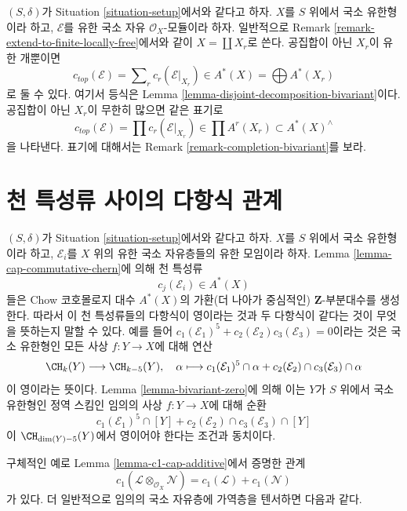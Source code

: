 \begin{remark}
\label{remark-top-chern-class}
$(S, \delta)$가 Situation \ref{situation-setup}에서와 같다고 하자.
$X$를 $S$ 위에서 국소 유한형이라 하고, $\mathcal{E}$를 유한 국소
자유 $\mathcal{O}_X$-모듈이라 하자. 일반적으로 Remark
\ref{remark-extend-to-finite-locally-free}에서와 같이
$X = \coprod X_r$로 쓴다. 공집합이 아닌 $X_r$이 유한 개뿐이면
$$
c_{top}(\mathcal{E}) = \sum\nolimits_r c_r(\mathcal{E}|_{X_r})
\in A^*(X) = \bigoplus A^*(X_r)
$$
로 둘 수 있다. 여기서 등식은 Lemma
\ref{lemma-disjoint-decomposition-bivariant}이다. 공집합이 아닌
$X_r$이 무한히 많으면 같은 표기로
$$
c_{top}(\mathcal{E}) = \prod c_r(\mathcal{E}|_{X_r})
\in \prod A^r(X_r) \subset A^*(X)^\wedge
$$
을 나타낸다. 표기에 대해서는 Remark
\ref{remark-completion-bivariant}를 보라.
\end{remark}











\section{천 특성류 사이의 다항식 관계}
\label{section-relations-chern-classes}

\noindent
$(S, \delta)$가 Situation \ref{situation-setup}에서와 같다고 하자.
$X$를 $S$ 위에서 국소 유한형이라 하고, $\mathcal{E}_i$를 $X$ 위의
유한 국소 자유층들의 유한 모임이라 하자. Lemma
\ref{lemma-cap-commutative-chern}에 의해 천 특성류
$$
c_j(\mathcal{E}_i) \in A^*(X)
$$
들은 Chow 코호몰로지 대수 $A^*(X)$의 가환(더 나아가 중심적인)
$\mathbf{Z}$-부분대수를 생성한다. 따라서 이 천 특성류들의 다항식이
영이라는 것과 두 다항식이 같다는 것이 무엇을 뜻하는지 말할 수 있다.
예를 들어
$c_1(\mathcal{E}_1)^5 + c_2(\mathcal{E}_2)c_3(\mathcal{E}_3) = 0$이라는
것은 국소 유한형인 모든 사상 $f : Y \to X$에 대해 연산
$$
\CH_k(Y) \longrightarrow \CH_{k - 5}(Y), \quad
\alpha \longmapsto
c_1(\mathcal{E}_1)^5 \cap \alpha +
c_2(\mathcal{E}_2) \cap c_3(\mathcal{E}_3) \cap \alpha
$$
이 영이라는 뜻이다. Lemma \ref{lemma-bivariant-zero}에 의해 이는
$Y$가 $S$ 위에서 국소 유한형인 정역 스킴인 임의의 사상
$f : Y \to X$에 대해 순환
$$
c_1(\mathcal{E}_1)^5 \cap [Y] +
c_2(\mathcal{E}_2) \cap c_3(\mathcal{E}_3) \cap [Y]
$$
이 $\CH_{\dim(Y) - 5}(Y)$에서 영이어야 한다는 조건과 동치이다.

\medskip\noindent
구체적인 예로 Lemma \ref{lemma-c1-cap-additive}에서 증명한 관계
$$
c_1(\mathcal{L} \otimes_{\mathcal{O}_X} \mathcal{N})
=
c_1(\mathcal{L}) + c_1(\mathcal{N})
$$
가 있다. 더 일반적으로 임의의 국소 자유층에 가역층을 텐서하면 다음과
같다.

